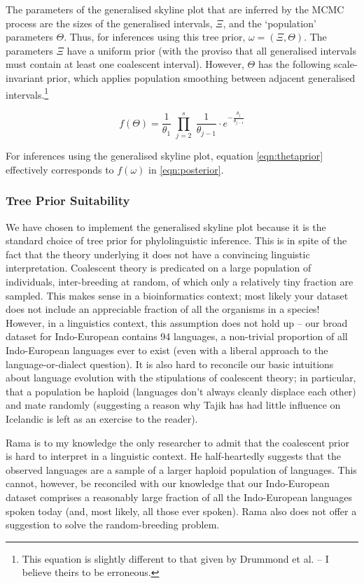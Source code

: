 \documentclass[10pt,journal,compsoc]{IEEEtran}
\begin{document}
The parameters of the generalised skyline plot that are inferred by the MCMC process are the sizes of the generalised intervals, $\Xi$, and the `population' parameters $\Theta$. Thus, for inferences using this tree prior, $\omega = (\Xi, \Theta)$. The parameters $\Xi$ have a uniform prior (with the proviso that all generalised intervals must contain at least one coalescent interval). However, $\Theta$ has the following scale-invariant prior, which applies population smoothing between adjacent generalised intervals.\footnote{This equation is slightly different to that given by Drummond et al. -- I believe theirs to be erroneous.}

\begin{equation}\label{eqn:thetaprior}
    f(\Theta) = \frac{1}{\theta_1} \; \prod_{j=2}^s\; \frac{1}{\theta_{j-1}} \cdot e^{-\frac{\theta_j}{\theta_{j-1}}}
\end{equation}

For inferences using the generalised skyline plot, equation \eqref{eqn:thetaprior} effectively corresponds to $f(\omega)$ in \eqref{eqn:posterior}.

\subsubsection{Tree Prior Suitability}

We have chosen to implement the generalised skyline plot because it is the standard choice of tree prior for phylolinguistic inference. This is in spite of the fact that the theory underlying it does not have a convincing linguistic interpretation. Coalescent theory is predicated on a large population of individuals, inter-breeding at random, of which only a relatively tiny fraction are sampled. This makes sense in a bioinformatics context; most likely your dataset does not include an appreciable fraction of all the organisms in a species! However, in a linguistics context, this assumption does not hold up -- our broad dataset for Indo-European contains 94 languages, a non-trivial proportion of all Indo-European languages ever to exist (even with a liberal approach to the language-or-dialect question). It is also hard to reconcile our basic intuitions about language evolution with the stipulations of coalescent theory; in particular, that a population be haploid (languages don't always cleanly displace each other) and mate randomly (suggesting a reason why Tajik has had little influence on Icelandic is left as an exercise to the reader).

Rama is to my knowledge the only researcher to admit that the coalescent prior is hard to interpret in a linguistic context. He half-heartedly suggests that the observed languages are a sample of a larger haploid population of languages. This cannot, however, be reconciled with our knowledge that our Indo-European dataset comprises a reasonably large fraction of all the Indo-European languages spoken today (and, most likely, all those ever spoken). Rama also does not offer a suggestion to solve the random-breeding problem.
\end{document}

